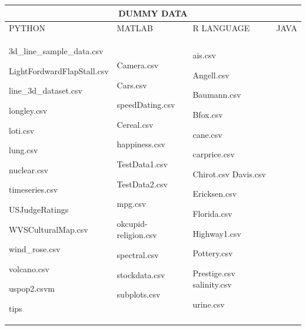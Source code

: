 \documentclass[12pt, a4paper,oneside]{report}
\begin{document}
\begin{table}[h]
	\centering {} \small
	\begin{tabular}{|p{5cm}|p{3cm}|p{3cm}|p{4cm}|}
		
		 \hline
		 \multicolumn{4}{|c|}{DUMMY DATA} \\
		 \hline
				
		PYTHON & MATLAB & R LANGUAGE & JAVA\\ \hline
		
		3d\_line\_sample\_data.csv \par LightFordwardFlapStall.csv  \par line\_3d\_dataset.csv \par
		longley.csv  \par loti.csv  \par lung.csv  \par nuclear.csv  \par timeseries.csv  \par
		USJudgeRatings	\par WVSCulturalMap.csv  \par wind\_rose.csv  \par volcano.csv  \par uspop2.csvm \par tips &
		
		Camera.csv \par Cars.csv \par speedDating.csv \par Cereal.csv  \par happiness.csv \par TestData1.csv \par TestData2.csv  \par mpg.csv \par okcupid-religion.csv  \par spectral.csv
		\par stockdata.csv \par subplots.csv  & 
		
		ais.csv \par Angell.csv  \par Baumann.csv \par Bfox.csv \par cane.csv \par carprice.csv \par Chirot.csv
		Davis.csv \par Ericksen.csv \par Florida.csv \par Highway1.csv \par Pottery.csv \par Prestige.csv 
		salinity.csv \par urine.csv & 
		

\end{tabular}
\end{table}
\end{document}
